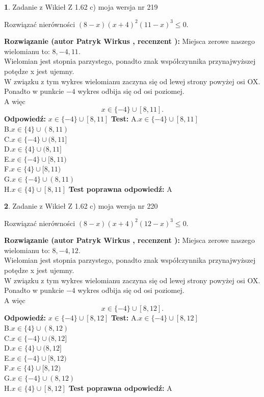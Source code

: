 \documentclass[12pt, a4paper]{article}
\theoremstyle{definition} %
\newtheorem{zad}{}
\newcommand{\zadStart}[1]{\begin{zad}#1\newline}
\newcommand{\zadStop}{\end{zad}}
\newcommand{\rozwStart}[2]{\noindent \textbf{Rozwiązanie (autor #1 , recenzent #2): }\newline}
\newcommand{\rozwStop}{\newline}
\newcommand{\odpStart}{\noindent \textbf{Odpowiedź:}\newline}
\newcommand{\odpStop}{\newline}
\newcommand{\testStart}{\noindent \textbf{Test:}\newline}
\newcommand{\testStop}{\newline}
\newcommand{\kluczStart}{\noindent \textbf{Test poprawna odpowiedź:}\newline}
\newcommand{\kluczStop}{\newline}
\begin{document}
\zadStart{Zadanie z Wikieł Z 1.62 c) moja wersja nr 219}

Rozwiązać nierówności $(8-x)(x+4)^{2}(11-x)^{3}\le0$.
\zadStop
\rozwStart{Patryk Wirkus}{}
Miejsca zerowe naszego wielomianu to: $8, -4, 11$.\\
Wielomian jest stopnia parzystego, ponadto znak współczynnika przy\linebreak najwyższej potędze x jest ujemny.\\ W związku z tym wykres wielomianu zaczyna się od lewej strony powyżej osi OX.\\
Ponadto w punkcie $-4$ wykres odbija się od osi poziomej.\\
A więc $$x \in \{-4\} \cup [8,11].$$
\rozwStop
\odpStart
$x \in \{-4\} \cup [8,11]$
\odpStop
\testStart
A.$x \in \{-4\} \cup [8,11]$\\
B.$x \in \{4\} \cup (8,11)$\\
C.$x \in \{-4\} \cup (8,11]$\\
D.$x \in \{4\} \cup (8,11]$\\
E.$x \in \{-4\} \cup [8,11)$\\
F.$x \in \{4\} \cup [8,11)$\\
G.$x \in \{-4\} \cup (8,11)$\\
H.$x \in \{4\} \cup [8,11]$
\testStop
\kluczStart
A
\kluczStop



\zadStart{Zadanie z Wikieł Z 1.62 c) moja wersja nr 220}

Rozwiązać nierówności $(8-x)(x+4)^{2}(12-x)^{3}\le0$.
\zadStop
\rozwStart{Patryk Wirkus}{}
Miejsca zerowe naszego wielomianu to: $8, -4, 12$.\\
Wielomian jest stopnia parzystego, ponadto znak współczynnika przy\linebreak najwyższej potędze x jest ujemny.\\ W związku z tym wykres wielomianu zaczyna się od lewej strony powyżej osi OX.\\
Ponadto w punkcie $-4$ wykres odbija się od osi poziomej.\\
A więc $$x \in \{-4\} \cup [8,12].$$
\rozwStop
\odpStart
$x \in \{-4\} \cup [8,12]$
\odpStop
\testStart
A.$x \in \{-4\} \cup [8,12]$\\
B.$x \in \{4\} \cup (8,12)$\\
C.$x \in \{-4\} \cup (8,12]$\\
D.$x \in \{4\} \cup (8,12]$\\
E.$x \in \{-4\} \cup [8,12)$\\
F.$x \in \{4\} \cup [8,12)$\\
G.$x \in \{-4\} \cup (8,12)$\\
H.$x \in \{4\} \cup [8,12]$
\testStop
\kluczStart
A
\kluczStop
\end{document}
